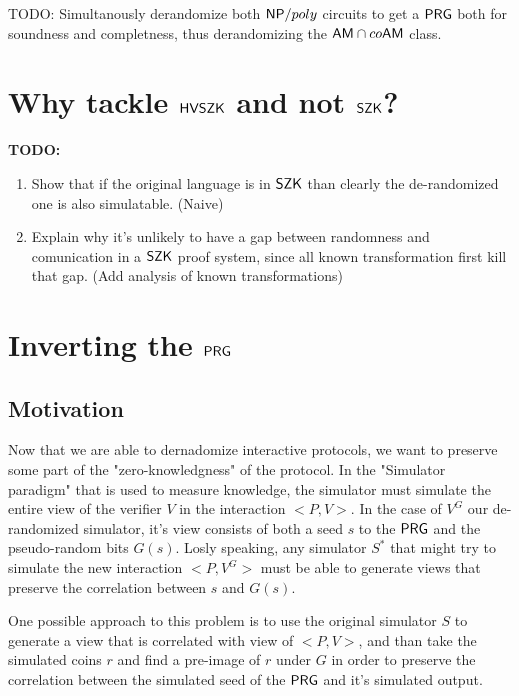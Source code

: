 \documentclass[11]{article}
\newenvironment{proof}[1][Proof]{\begin{trivlist}
\item[\hskip \labelsep {\bfseries #1}]}{\end{trivlist}}
\begin{document}
\begin{proof}
\begin{theorem}


TODO: Simultanously derandomize both $\mathsf{NP} / poly$ circuits to get a $\mathsf{PRG}$ both for soundness and completness, thus derandomizing the $\mathsf{AM} \cap co\mathsf{AM}$ class.

\end{theorem}

\end{proof}

\section{Why tackle $\mathsf{HVSZK}$ and not $\mathsf{SZK}$?}
\textbf{TODO:}
\begin{enumerate}
	\item Show that if the original language is in $\mathsf{SZK}$ than clearly the de-randomized one is also simulatable. (Naive)
	\item Explain why it's unlikely to have a gap between randomness and comunication in a $\mathsf{SZK}$ proof system, since all known transformation first kill that gap. (Add analysis of known transformations)

	
\end{enumerate}


\section{Inverting the $\mathsf{PRG}$}
\subsection{Motivation}

Now that we are able to dernadomize interactive protocols, we want to preserve some part of the "zero-knowledgness" of the protocol. In the "Simulator paradigm" that is used to measure knowledge, the simulator must simulate the entire view of the verifier $V$ in the interaction $<P,V>$. In the case of $V^G$ our de-randomized simulator, it's view consists of both a seed $s$ to the $\mathsf{PRG}$ and the pseudo-random bits $G(s)$. Losly speaking, any simulator $S^*$ that might try to simulate the new interaction $<P, V^G>$ must be able to generate views that preserve the correlation between $s$ and $G(s)$.

One possible approach to this problem is to use the original simulator $S$ to generate a view that is correlated with view of $<P,V>$, and than take the simulated coins $r$ and find a pre-image of $r$ under $G$ in order to preserve the correlation between the simulated seed of the $\mathsf{PRG}$ and it's simulated output.
\end{document}
